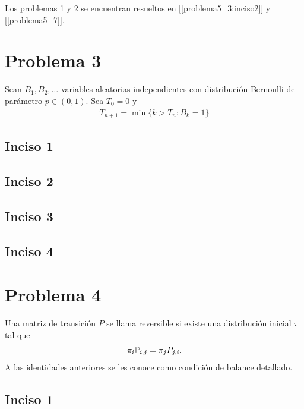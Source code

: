 Los problemas 1 y 2 se encuentran resueltos en [\ref{problema5_3:inciso2}] y [\ref{problema5_7}].

\section{Problema 3}
Sean $B_1, B_2, \dots$ variables aleatorias independientes con distribución Bernoulli de parámetro $p \in (0,1)$.
Sea $T_0 = 0$ y
\begin{align}
    T_{n+1} = \min\{k>T_n : B_k = 1\}
\end{align}
    \subsection{Inciso 1}
        
        \newpage
        
    \subsection{Inciso 2}
        
        \newpage
        
    \subsection{Inciso 3}
        
        \newpage
        
    \subsection{Inciso 4}
        
        \newpage
        
\section{Problema 4}
Una matriz de transición $P$ se llama reversible si existe una distribución inicial $\pi$ tal que
\begin{align}
    \pi_i \P_{i,j} = \pi_j P_{j,i}.
\end{align}
A las identidades anteriores se les conoce como condición de balance detallado.
    \subsection{Inciso 1}
        
        \newpage
        
